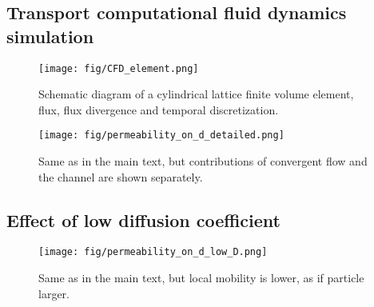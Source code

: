 \documentclass[10pt, a4paper]{article}
\begin{document}
\pagebreak

\subsection*{Transport computational fluid dynamics simulation}

\begin{figure}
    \centering
    \texttt{[image: fig/CFD\_element.png]}
    \caption{
        Schematic diagram of a cylindrical lattice finite volume element, flux, flux divergence and temporal discretization.
        }
    \label{fig:CFD_element}
\end{figure}

\begin{figure}
    \centering
    \texttt{[image: fig/permeability\_on\_d\_detailed.png]}
    \caption{
        Same as in the main text, but contributions of convergent flow and the channel are shown separately.
        }
    \label{fig:permeability_on_d_detailed}
\end{figure}

\subsection*{Effect of low diffusion coefficient}
\begin{figure}
    \centering
    \texttt{[image: fig/permeability\_on\_d\_low\_D.png]}
    \caption{
        Same as in the main text, but local mobility is lower, as if particle larger.
        }
    \label{fig:permeability_ond_low_D}
\end{figure}
\end{document}
